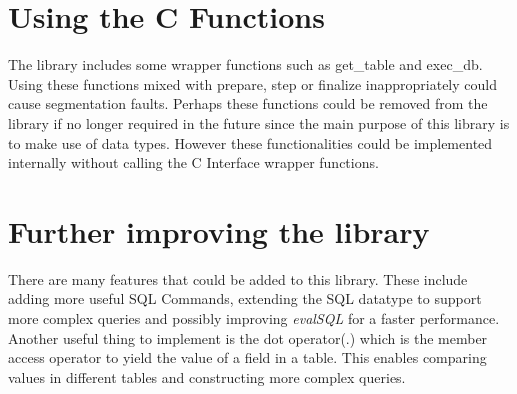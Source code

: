 \documentclass[11pt]{article}
\begin{document}
\section{Using the C Functions}
\label{Using the C Functions}
The library includes some wrapper functions such as get\_table
and exec\_db. Using these functions mixed with prepare, step or finalize
inappropriately could cause segmentation faults.
Perhaps these functions could be removed from the library if no longer required in the future
since the main purpose of this library is to make use of data types.
However these functionalities could be implemented internally without calling 
the C Interface wrapper functions.

\section{Further improving the library}
\label{Further improving the library}
There are many features that could be added to this library. These include adding more useful SQL Commands,
extending the SQL datatype to support more complex queries and possibly improving \emph{evalSQL}
for a faster performance.
Another useful thing to implement is the dot operator(.) which is the member access operator to yield
the value of a field in a table. This enables comparing values in different tables and constructing
more complex queries.
\end{document}
